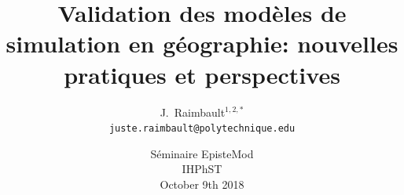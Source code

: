 \documentclass[english,11pt]{beamer}
\begin{document}
\title{Validation des modèles de simulation en géographie: nouvelles pratiques et perspectives}

\author{J.~Raimbault$^{1,2,\ast}$\\
\texttt{juste.raimbault@polytechnique.edu}
}




\date{Séminaire EpisteMod\\\smallskip
IHPhST\\\smallskip
October 9th 2018
}

\frame{\maketitle}


% 


\end{document}
